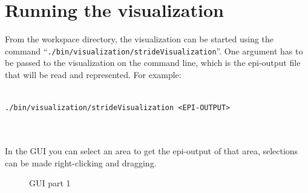 \section{Running the visualization}	

From the workspace directory, the visualization can be started  using the command \mbox{``\texttt{./bin/visualization/strideVisualization}''}. One argument has to be passed to the visualization on the command line, which is the epi-output file that will be read and represented. For example: \\ \\
\centerline{\texttt{./bin/visualization/strideVisualization \textless EPI-OUTPUT\textgreater}} \\ \\
In the GUI you can select an area to get the epi-output of that area, selections can be made right-clicking and dragging.

\begin{center}
	\begin{figure}[hbtp!]
		\caption{GUI part 1} \label{gui1}
	\end{figure}
\end{center}

